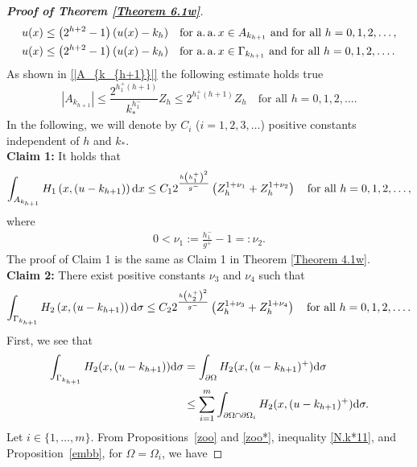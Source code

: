 \documentclass[10pt,reqno]{amsart}
\newcommand *\w{^\wedge}
\theoremstyle{definition}
\numberwithin{equation}{section}
\begin{document}
\begin{proof}[\textbf{Proof of Theorem \ref{Theorem 6.1w}}]
	\begin{align}
		u(x)&\leq \left(2^{h+2}-1\right)(u(x)-k_{h})\quad \text{for a.\,a.\,}x\in A_{k_{h+1}} \text{ and for all } h=0,1,2,\ldots,\label{N.est.u111}\\
		u(x)&\leq \left(2^{h+2}-1\right)(u(x)-k_{h})\quad \text{for a.\,a.\,}x\in \Gamma_{k_{h+1}}\text{ and for all } h=0,1,2,\ldots. \label{N.est.u211}
	\end{align}
	As shown in \eqref{|A_{k_{h+1}}|} the following estimate hol{\rm d}s true
	\begin{equation} \label{N.|A_k|1}
	|A_{k_{h+1}}|  \leq \frac{2^{h_1^+(h+1)}}{k_*^{h^-_1}} Z_h\leq 2^{h^+_1(h+1)} Z_h\quad \text{for all }h=0,1,2,\ldots.
	\end{equation}
	In the following, we will denote by $C_i$ ($i=1,2,3,\ldots$) positive constants independent of $h$ and $k_*$.\\
	{\bf Claim 1:} It hol{\rm d}s that
	\begin{equation*}%
		\int_{A_{k_{h+1}}}H_1\left(x,(u-k_{h+1})\right){\rm d}x\leq  C_1 2^{\frac{h\left(h^+_1\right)^2}{g^-}}\left(Z_{h}^{1+\nu_1}+Z_{h}^{1+\nu_2}\right)\quad \text{for all } h=0,1,2,\ldots,
	\end{equation*}
	where
	\begin{align*}
		0<\nu_1:=\frac{h_1^-}{g^+}-1=:\nu_2.
	\end{align*}
	The proof of Claim 1 is the same as Claim 1 in Theorem \ref{Theorem 4.1w}.\\	
	{\bf Claim 2:} There exist positive constants $\nu_3$ and $\nu_4$ such that
	\begin{equation*}%
		\int_{\Gamma_{k_{h+1}}}H_2\left(x,(u-k_{h+1})\right){\rm d} \sigma\leq  C_2 2^{\frac{h\left(h^+_2\right)^2}{g^-}}\left(Z_{h}^{1+\nu_3}+Z_{h}^{1+\nu_4}\right)\quad \text{for all } h=0,1,2,\ldots.
	\end{equation*}
	First, we see that
	\begin{align}\label{N.deco.Bdr11}
		\begin{split}
			\int_{\Gamma_{k_{h+1}}}H_2(x,(u-k_{h+1})){\rm d} \sigma
			&=\int_{\partial\Omega}H_2(x,(u-k_{h+1})^+){\rm d} \sigma\\
			& \leq \sum_{i=1}^m\int_{\partial\Omega\cap \partial \Omega_{i}}H_2(x,(u-k_{h+1})^+){\rm d} \sigma.
		\end{split}
	\end{align}
	Let \( i \in \{1, \ldots, m\} \). From Propositions~\ref{zoo} and \ref{zoo*}, inequality \eqref{N.k*11}, and Proposition~\ref{embb}, for \( \Omega = \Omega_i \), we have

\end{proof}
\end{document}
